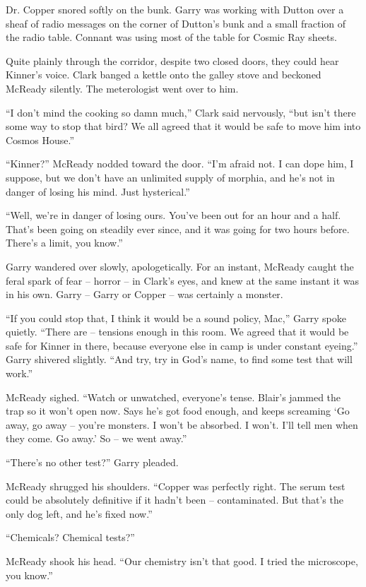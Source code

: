 \documentclass[ebook,oneside,11pt]{memoir}				%
\begin{document}
Dr. Copper snored softly on the bunk. Garry was working with Dutton over a sheaf of radio messages on the corner of Dutton's bunk and a small fraction of the radio table. Connant was using most of the table for Cosmic Ray sheets.

Quite plainly through the corridor, despite two closed doors, they could hear Kinner's voice. Clark banged a kettle onto the galley stove and beckoned McReady silently. The meterologist went over to him.

``I don't mind the cooking so damn much,'' Clark said nervously, ``but isn't there some way to stop that bird? We all agreed that it would be safe to move him into Cosmos House.''

``Kinner?'' McReady nodded toward the door. ``I'm afraid not. I can dope him, I suppose, but we don't have an unlimited supply of morphia, and he's not in danger of losing his mind. Just hysterical.''

``Well, we're in danger of losing ours. You've been out for an hour and a half. That's been going on steadily ever since, and it was going for two hours before. There's a limit, you know.''

Garry wandered over slowly, apologetically. For an instant, McReady caught the feral spark of fear -- horror -- in Clark's eyes, and knew at the same instant it was in his own. Garry -- Garry or Copper -- was certainly a monster.

``If you could stop that, I think it would be a sound policy, Mac,'' Garry spoke quietly. ``There are -- tensions enough in this room. We agreed that it would be safe for Kinner in there, because everyone else in camp is under constant eyeing.'' Garry shivered slightly. ``And try, try in God's name, to find some test that will work.''

McReady sighed. ``Watch or unwatched, everyone's tense. Blair's jammed the trap so it won't open now. Says he's got food enough, and keeps screaming `Go away, go away -- you're monsters. I won't be absorbed. I won't. I'll tell men when they come. Go away.' So -- we went away.''

``There's no other test?'' Garry pleaded.

McReady shrugged his shoulders. ``Copper was perfectly right. The serum test could be absolutely definitive if it hadn't been -- contaminated. But that's the only dog left, and he's fixed now.''

``Chemicals? Chemical tests?''

McReady shook his head. ``Our chemistry isn't that good. I tried the microscope, you know.''
\end{document}
